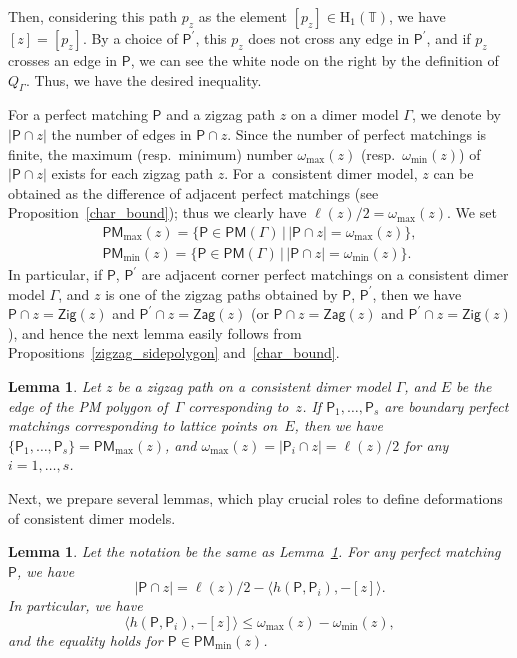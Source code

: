 \documentclass[pdftex]{sigma}%
\numberwithin{equation}{section}
\numberwithin{figure}{section}
\numberwithin{table}{section}
\newtheorem{Lemma}[Theorem]{Lemma}
\newcommand{\TT}{\mathbb{T}}
\newcommand{\rmH}{\mathrm{H}}
\newcommand{\sfP}{\mathsf{P}}
\newcommand{\Zig}{\mathsf{Zig}}
\newcommand{\Zag}{\mathsf{Zag}}
\newcommand{\PM}{\mathsf{PM}}
\begin{document}
\begin{observation}[{cf.~\cite[Section~5.3]{IU2}}]
Then, considering this path $p_z$ as the element $[p_z]\in\rmH_1(\TT)$, we have $[z]=[p_z]$.
By a choice of $\sfP^\prime$, this $p_z$ does not cross any edge in $\sfP^\prime$, and if $p_z$ crosses an edge in $\sfP$, we can see the white node on the right by the definition of $Q_\Gamma$. Thus, we have the desired inequality.
\end{observation}

For a perfect matching $\sfP$ and a zigzag path $z$ on a dimer model $\Gamma$, we denote by $|\sfP\cap z|$ the number of edges in $\sfP\cap z$.
Since the number of perfect matchings is finite, the maximum (resp.\ minimum) number $\omega_{\max}(z)$ (resp.\ $\omega_{\min}(z)$) of $|\sfP\cap z|$ exists for each zigzag path $z$.
For a~consistent dimer model, $z$ can be obtained as the difference of adjacent perfect matchings (see Proposition~\ref{char_bound});
thus we clearly have $\ell(z)/2=\omega_{\max}(z)$.
We set
\begin{gather*}
\PM_{\max}(z)=\{\sfP\in\PM(\Gamma) \,|\, |\sfP\cap z|=\omega_{\max}(z)\},
\\
\PM_{\min}(z)=\{\sfP\in\PM(\Gamma) \,|\, |\sfP\cap z|=\omega_{\min}(z)\}.
\end{gather*}
In particular, if $\sfP$, $\sfP^\prime$ are adjacent corner perfect matchings on a consistent dimer model $\Gamma$, and $z$ is one of the zigzag paths obtained by $\sfP$, $\sfP^\prime$, then we have $\sfP\cap z=\Zig(z)$ and $\sfP^\prime\cap z=\Zag(z)$ (or $\sfP\cap z=\Zag(z)$ and $\sfP^\prime\cap z=\Zig(z)$),
and hence the next lemma easily follows from Propositions~\ref{zigzag_sidepolygon} and~\ref{char_bound}.

\begin{Lemma}\label{number_zigzag_corner}
Let $z$ be a zigzag path on a consistent dimer model $\Gamma$, and $E$ be the edge of the PM polygon of~$\Gamma$ corresponding to~$z$.
If $\sfP_1,\dots,\sfP_s$ are boundary perfect matchings corresponding to lattice points on~$E$, then we have
$\{\sfP_1,\dots,\sfP_s\}=\PM_{\max}(z)$, and $\omega_{\max}(z)=|\sfP_i\cap z|=\ell(z)/2$ for any $i=1,\dots,s$.
\end{Lemma}

Next, we prepare several lemmas, which play crucial roles to define deformations of consistent dimer models.

\begin{Lemma}\label{zigzag_lem1}
Let the notation be the same as Lemma~{\rm \ref{number_zigzag_corner}}.
For any perfect matching~$\sfP$, we have
\begin{displaymath}
|\sfP\cap z|=\ell(z)/2-\langle h(\sfP,\sfP_i),-[z]\rangle.
\end{displaymath}
In particular, we have
\begin{displaymath}
\langle h(\sfP,\sfP_i),-[z]\rangle\le \omega_{\max}(z)-\omega_{\min}(z),
\end{displaymath}
and the equality holds for $\sfP\in \PM_{\min}(z)$.
\end{Lemma}
\end{document}
